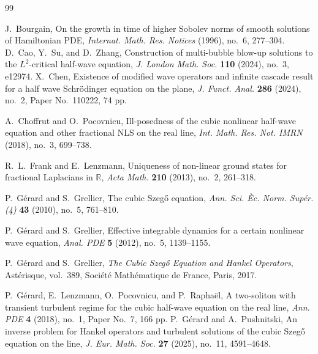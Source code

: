 \documentclass[11pt,reqno]{amsart}
\numberwithin{equation}{section}
\theoremstyle{remark}
\begin{document}
\begin{thebibliography}{99}

J.~Bourgain,
\newblock On the growth in time of higher Sobolev norms of smooth solutions of
Hamiltonian PDE,
\newblock \emph{Internat. Math. Res. Notices} (1996), no.~6, 277--304.
D.~Cao, Y.~Su, and D.~Zhang,
\newblock Construction of multi-bubble blow-up solutions to the
$L^2$-critical half-wave equation,
\newblock \emph{J. London Math. Soc.} \textbf{110} (2024), no.~3,
e12974.
X.~Chen,
\newblock Existence of modified wave operators and infinite cascade result for
a half wave Schr\"odinger equation on the plane,
\newblock \emph{J. Funct. Anal.} \textbf{286} (2024), no.~2,
Paper No.~110222, 74 pp.

A.~Choffrut and O.~Pocovnicu,
\newblock Ill-posedness of the cubic nonlinear half-wave equation and other
fractional NLS on the real line,
\newblock \emph{Int. Math. Res. Not. IMRN} (2018), no.~3, 699--738.

R.~L.~Frank and E.~Lenzmann,
\newblock Uniqueness of non-linear ground states for fractional Laplacians in
$\mathbb R$,
\newblock \emph{Acta Math.} \textbf{210} (2013), no.~2, 261--318.

P.~G\'erard and S.~Grellier,
\newblock The cubic Szeg\H{o} equation,
\newblock \emph{Ann. Sci. \`Ec. Norm. Sup\'er. (4)} \textbf{43} (2010), no.~5,
761--810.

P.~G\'erard and S.~Grellier,
\newblock Effective integrable dynamics for a certain nonlinear wave equation,
\newblock \emph{Anal. PDE} \textbf{5} (2012), no.~5, 1139--1155.

P.~G\'erard and S.~Grellier,
\newblock \emph{The Cubic Szeg\H{o} Equation and Hankel Operators},
\newblock Ast\'erisque, vol.~389, Soci\'et\'e Math\'ematique de France, Paris,
2017.

P.~G\'erard, E.~Lenzmann, O.~Pocovnicu, and P.~Rapha\"el,
\newblock A two-soliton with transient turbulent regime for the cubic half-wave
equation on the real line,
\newblock \emph{Ann. PDE} \textbf{4} (2018), no.~1, Paper No.~7, 166 pp.
P.~G\'erard and A.~Pushnitski,
\newblock An inverse problem for Hankel operators and turbulent solutions of
the cubic Szeg\H{o} equation on the line,
\newblock \emph{J. Eur. Math. Soc.} \textbf{27} (2025), no.~11,
4591--4648.


\end{thebibliography}
\end{document}
